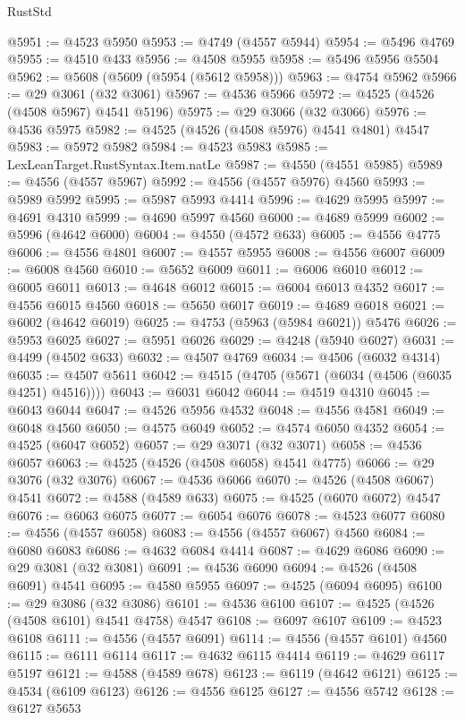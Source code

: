 \begin{lexlean}{RustStd}
\begin{coremodule}
{\begin{coremodule}
{{{{{{{{{{{{{{{{{{{{{{{{{{{{{{{{{{{{{{{{{{{{{{{{{{{{{{{@5951 := @4523 @5950
@5953 := @4749 (@4557 @5944)
@5954 := @5496 @4769
@5955 := @4510 @433
@5956 := @4508 @5955
@5958 := @5496 @5956 @5504
@5962 := @5608 (@5609 (@5954 (@5612 @5958)))
@5963 := @4754 @5962
@5966 := @29 @3061 (@32 @3061)
@5967 := @4536 @5966
@5972 := @4525 (@4526 (@4508 @5967) @4541 @5196)
@5975 := @29 @3066 (@32 @3066)
@5976 := @4536 @5975
@5982 := @4525 (@4526 (@4508 @5976) @4541 @4801) @4547
@5983 := @5972 @5982
@5984 := @4523 @5983
@5985 := LexLeanTarget.RustSyntax.Item.natLe
@5987 := @4550 (@4551 @5985)
@5989 := @4556 (@4557 @5967)
@5992 := @4556 (@4557 @5976) @4560
@5993 := @5989 @5992
@5995 := @5987 @5993 @4414
@5996 := @4629 @5995
@5997 := @4691 @4310
@5999 := @4690 @5997 @4560
@6000 := @4689 @5999
@6002 := @5996 (@4642 @6000)
@6004 := @4550 (@4572 @633)
@6005 := @4556 @4775
@6006 := @4556 @4801
@6007 := @4557 @5955
@6008 := @4556 @6007
@6009 := @6008 @4560
@6010 := @5652 @6009
@6011 := @6006 @6010
@6012 := @6005 @6011
@6013 := @4648 @6012
@6015 := @6004 @6013 @4352
@6017 := @4556 @6015 @4560
@6018 := @5650 @6017
@6019 := @4689 @6018
@6021 := @6002 (@4642 @6019)
@6025 := @4753 (@5963 (@5984 @6021)) @5476
@6026 := @5953 @6025
@6027 := @5951 @6026
@6029 := @4248 (@5940 @6027)
@6031 := @4499 (@4502 @633)
@6032 := @4507 @4769
@6034 := @4506 (@6032 @4314)
@6035 := @4507 @5611
@6042 := @4515 (@4705 (@5671 (@6034 (@4506 (@6035 @4251) @4516))))
@6043 := @6031 @6042
@6044 := @4519 @4310
@6045 := @6043 @6044
@6047 := @4526 @5956 @4532
@6048 := @4556 @4581
@6049 := @6048 @4560
@6050 := @4575 @6049
@6052 := @4574 @6050 @4352
@6054 := @4525 (@6047 @6052)
@6057 := @29 @3071 (@32 @3071)
@6058 := @4536 @6057
@6063 := @4525 (@4526 (@4508 @6058) @4541 @4775)
@6066 := @29 @3076 (@32 @3076)
@6067 := @4536 @6066
@6070 := @4526 (@4508 @6067) @4541
@6072 := @4588 (@4589 @633)
@6075 := @4525 (@6070 @6072) @4547
@6076 := @6063 @6075
@6077 := @6054 @6076
@6078 := @4523 @6077
@6080 := @4556 (@4557 @6058)
@6083 := @4556 (@4557 @6067) @4560
@6084 := @6080 @6083
@6086 := @4632 @6084 @4414
@6087 := @4629 @6086
@6090 := @29 @3081 (@32 @3081)
@6091 := @4536 @6090
@6094 := @4526 (@4508 @6091) @4541
@6095 := @4580 @5955
@6097 := @4525 (@6094 @6095)
@6100 := @29 @3086 (@32 @3086)
@6101 := @4536 @6100
@6107 := @4525 (@4526 (@4508 @6101) @4541 @4758) @4547
@6108 := @6097 @6107
@6109 := @4523 @6108
@6111 := @4556 (@4557 @6091)
@6114 := @4556 (@4557 @6101) @4560
@6115 := @6111 @6114
@6117 := @4632 @6115 @4414
@6119 := @4629 @6117 @5197
@6121 := @4588 (@4589 @678)
@6123 := @6119 (@4642 @6121)
@6125 := @4534 (@6109 @6123)
@6126 := @4556 @6125
@6127 := @4556 @5742
@6128 := @6127 @5653
}}}}}}}}}}}}}}}}}}}}}}}}}}}}}}}}}}}}}}}}}}}}}}}}}}}}}}}
\end{coremodule}}
\end{coremodule}
\end{lexlean}
